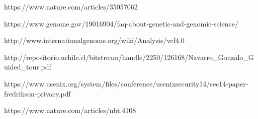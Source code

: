 \begin{thebibliography}{5}
  
  https://www.nature.com/articles/35057062

  https://www.genome.gov/19016904/faq-about-genetic-and-genomic-science/

  http://www.internationalgenome.org/wiki/Analysis/vcf4.0
  
  http://repositorio.uchile.cl/bitstream\-/handle/2250/126168/Navarro\_Gonzalo\-\_Guided\_tour.pdf

  https://www.usenix.org/system/files/conference/usenixsecurity14/sec14-paper-fredrikson-privacy.pdf

  https://www.nature.com/articles/nbt.4108
  
\end{thebibliography}
